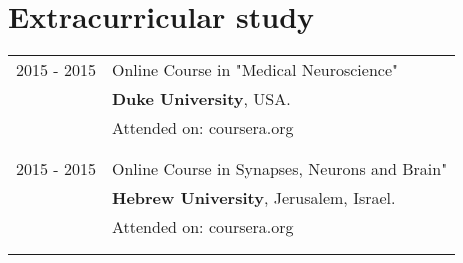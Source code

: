 \documentclass[a4paper,10pt]{article}
\begin{document}
\section{Extracurricular study}
\begin{tabular}{rl}	

    \textsc{2015 - 2015}& Online Course in "Medical Neuroscience" \\& 
    \normalsize\textbf{Duke University}, USA.\\
    & \small Attended on: coursera.org\\
    \\&\\

    \textsc{2015 - 2015}& Online Course in Synapses, Neurons and Brain" \\& 
    \normalsize\textbf{Hebrew University}, Jerusalem, Israel.\\
    & \small Attended on: coursera.org\\
    \\&\\

\end{tabular}

\end{document}
